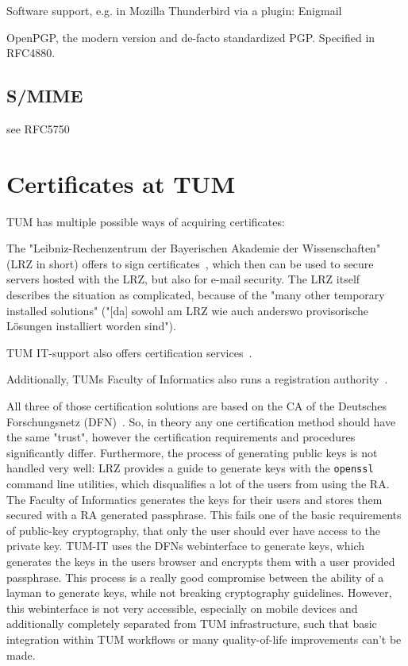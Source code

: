 Software support, e.g. in Mozilla Thunderbird via a plugin: Enigmail

OpenPGP, the modern version and de-facto standardized PGP.
Specified in RFC4880.

\subsection{S/MIME}\label{subsec:s/mime}
see RFC5750


\section{Certificates at TUM}\label{sec:certificatesAtTum}

TUM has multiple possible ways of acquiring certificates:

The "Leibniz-Rechenzentrum der Bayerischen Akademie der Wissenschaften" (LRZ in short) offers to sign
certificates~\cite{lrzpki}, which then can be used to secure servers hosted with the LRZ, but also for e-mail security.
The LRZ itself describes the situation as complicated, because of the "many other temporary installed solutions"
("[da] sowohl am LRZ wie auch anderswo provisorische L\"osungen installiert worden sind").

TUM IT-support also offers certification services~\cite{tumZertifikat}.

Additionally, TUMs Faculty of Informatics also runs a registration authority~\cite{inTumCertificates}.

All three of those certification solutions are based on the CA of the Deutsches Forschungsnetz (DFN)~\cite{dfnPki}.
So, in theory any one certification method should have the same "trust", however the certification requirements and
procedures significantly differ.
Furthermore, the process of generating public keys is not handled very well: LRZ provides a guide to generate keys with
the \lstinline{openssl} command line utilities, which disqualifies a lot of the users from using the RA\@.
The Faculty of Informatics generates the keys for their users and stores them secured with a RA generated passphrase.
This fails one of the basic requirements of public-key cryptography, that only the user should ever have access to the
private key.
TUM-IT uses the DFNs webinterface to generate keys, which generates the keys in the users browser and encrypts them with
a user provided passphrase.
This process is a really good compromise between the ability of a layman to generate keys, while not breaking
cryptography guidelines.
However, this webinterface is not very accessible, especially on mobile devices and additionally completely separated
from TUM infrastructure, such that basic integration within TUM workflows or many quality-of-life improvements can't be
made.

